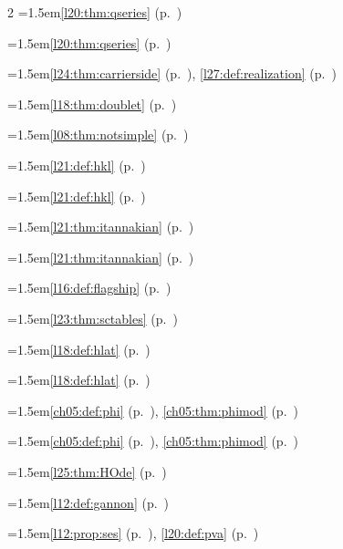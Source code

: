 \begin{multicols}{2}
\hangindent=1.5em\quad \ref{l20:thm:qseries} (p.~\pageref{l20:thm:qseries})\par
\hangindent=1.5em\quad \ref{l20:thm:qseries} (p.~\pageref{l20:thm:qseries})\par
\hangindent=1.5em\quad \ref{l24:thm:carrierside} (p.~\pageref{l24:thm:carrierside}), \ref{l27:def:realization} (p.~\pageref{l27:def:realization})\par
\hangindent=1.5em\quad \ref{l18:thm:doublet} (p.~\pageref{l18:thm:doublet})\par
\hangindent=1.5em\quad \ref{l08:thm:notsimple} (p.~\pageref{l08:thm:notsimple})\par
\hangindent=1.5em\quad \ref{l21:def:hkl} (p.~\pageref{l21:def:hkl})\par
\hangindent=1.5em\quad \ref{l21:def:hkl} (p.~\pageref{l21:def:hkl})\par
\hangindent=1.5em\quad \ref{l21:thm:itannakian} (p.~\pageref{l21:thm:itannakian})\par
\hangindent=1.5em\quad \ref{l21:thm:itannakian} (p.~\pageref{l21:thm:itannakian})\par
\hangindent=1.5em\quad \ref{l16:def:flagship} (p.~\pageref{l16:def:flagship})\par
\hangindent=1.5em\quad \ref{l23:thm:sctables} (p.~\pageref{l23:thm:sctables})\par
\hangindent=1.5em\quad \ref{l18:def:hlat} (p.~\pageref{l18:def:hlat})\par
\hangindent=1.5em\quad \ref{l18:def:hlat} (p.~\pageref{l18:def:hlat})\par
\hangindent=1.5em\quad \ref{ch05:def:phi} (p.~\pageref{ch05:def:phi}), \ref{ch05:thm:phimod} (p.~\pageref{ch05:thm:phimod})\par
\hangindent=1.5em\quad \ref{ch05:def:phi} (p.~\pageref{ch05:def:phi}), \ref{ch05:thm:phimod} (p.~\pageref{ch05:thm:phimod})\par
\hangindent=1.5em\quad \ref{l25:thm:HOde} (p.~\pageref{l25:thm:HOde})\par
\hangindent=1.5em\quad \ref{l12:def:gannon} (p.~\pageref{l12:def:gannon})\par
\hangindent=1.5em\quad \ref{l12:prop:ses} (p.~\pageref{l12:prop:ses}), \ref{l20:def:pva} (p.~\pageref{l20:def:pva})\par

\end{multicols}
